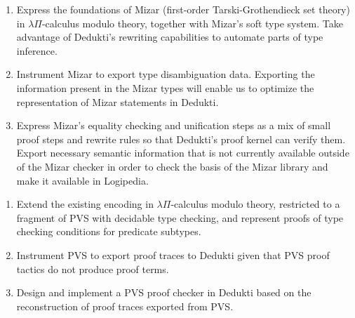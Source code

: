 \begin{workpackage}[id=theories,wphases=0-48,type=RTD,
  short=Theories in Dedukti,%
  title= Defining theories in Dedukti,
  lead=Inn,
  InnRM=6,
  BiaRM=48,
  LmuRM=12,
  SacRM=36,
  InrRM=24,
  ]
\begin{tasklist}
\begin{task}[id=mizar,
  title=Express the theory of Mizar in Dedukti,
  lead=Bia,   %
  BiaRM=0, %
  InnRM=0 %
  ]
  \begin{enumerate}
  \item Express the foundations of Mizar (first-order Tarski-Grothendieck set
    theory) in $\lambda\Pi$-calculus modulo theory, together with Mizar's soft
    type system. Take advantage of Dedukti's rewriting capabilities to automate
    parts of type inference.
  \item Instrument Mizar to export type disambiguation data. Exporting the
    information present in the Mizar types will enable us to optimize the
    representation of Mizar statements in Dedukti.
  \item Express Mizar's equality checking and unification steps as a mix of
    small proof steps and rewrite rules so that Dedukti's proof kernel can
    verify them. Export necessary semantic information that is not currently
    available outside of the Mizar checker in order to check the basis of the
    Mizar library and make it available in Logipedia.
  \end{enumerate}
\end{task}

\begin{task}[id=pvs,
  title=Express the theory of PVS in Dedukti,
  lead=Inr,   %
  InrRM=0  %
  ]
  \begin{enumerate}
  \item Extend the existing encoding in $\lambda\Pi$-calculus modulo theory,
    restricted to a fragment of PVS with decidable type checking, and represent
    proofs of type checking conditions for predicate subtypes.
  \item Instrument PVS to export proof traces to Dedukti given that PVS proof
    tactics do not produce proof terms.
  \item Design and implement a PVS proof checker in Dedukti based on the
    reconstruction of proof traces exported from PVS.
  \end{enumerate}
\end{task}


\end{tasklist}
\end{workpackage}
